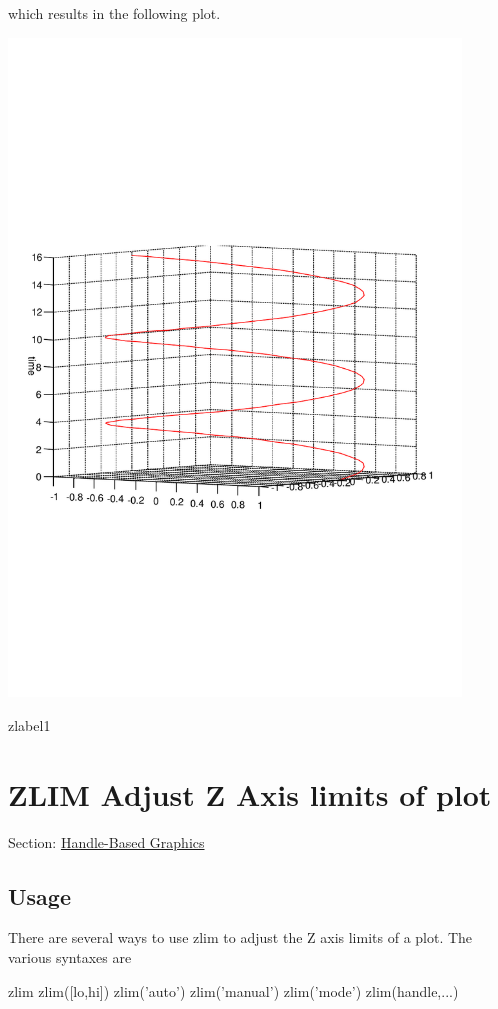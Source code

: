 which results in the following plot.  
\begin{DoxyImage}
\includegraphics[width=12cm]{zlabel1}
\caption{zlabel1}
\end{DoxyImage}
 \hypertarget{handle_zlim}{}\section{Z\-L\-I\-M Adjust Z Axis limits of plot}\label{handle_zlim}
Section\-: \hyperlink{sec_handle}{Handle-\/\-Based Graphics} \hypertarget{vtkwidgets_vtkxyplotwidget_Usage}{}\subsection{Usage}\label{vtkwidgets_vtkxyplotwidget_Usage}
There are several ways to use {\ttfamily zlim} to adjust the Z axis limits of a plot. The various syntaxes are \begin{DoxyVerb}   zlim
   zlim([lo,hi])   
   zlim('auto')
   zlim('manual')
   zlim('mode')
   zlim(handle,...)
\end{DoxyVerb}
